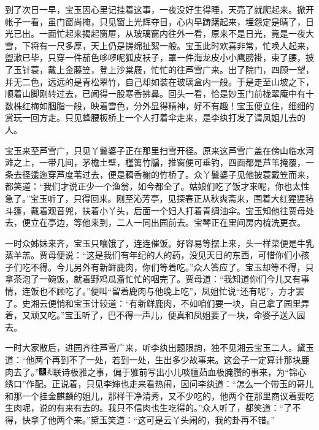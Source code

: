 到了次日一早，宝玉因心里记挂着这事，一夜没好生得睡，天亮了就爬起来。掀开帐子一看，虽门窗尚掩，只见窗上光辉夺目，心内早踌躇起来，埋怨定是晴了，日光已出。一面忙起来揭起窗屉，从玻璃窗内往外一看，原来不是日光，竟是一夜大雪，下将有一尺多厚，天上仍是搓绵扯絮一般。宝玉此时欢喜非常，忙唤人起来，盥漱已毕，只穿一件茄色哆啰呢狐皮袄子，罩一件海龙皮小小鹰膀褂，束了腰，披了玉针蓑，戴上金藤笠，登上沙棠屐，忙忙的往芦雪广来。出了院门，四顾一望，并无二色，远远的是青松翠竹，自己却如装在玻璃盒内一般。于是走至山坡之下，顺着山脚刚转过去，已闻得一股寒香拂鼻。回头一看，恰是妙玉门前栊翠庵中有十数株红梅如胭脂一般，映着雪色，分外显得精神，好不有趣！宝玉便立住，细细的赏玩一回方走。只见蜂腰板桥上一个人打着伞走来，是李纨打发了请凤姐儿去的人。

宝玉来至芦雪广，只见丫鬟婆子正在那里扫雪开径。原来这芦雪广盖在傍山临水河滩之上，一带几间，茅檐土壁，槿篱竹牖，推窗便可垂钓，四面都是芦苇掩覆，一条去径逶迤穿芦度苇过去，便是藕香榭的竹桥了。众丫鬟婆子见他披蓑戴笠而来，都笑道：``我们才说正少一个渔翁，如今都全了。姑娘们吃了饭才来呢，你也太性急了。''宝玉听了，只得回来。刚至沁芳亭，见探春正从秋爽斋来，围着大红猩猩毡斗篷，戴着观音兜，扶着小丫头，后面一个妇人打着青绸油伞。宝玉知他往贾母处去，便立在亭边，等他来到，二人一同出园前去。宝琴正在里间房内梳洗更衣。

一时众姊妹来齐，宝玉只嚷饿了，连连催饭。好容易等摆上来，头一样菜便是牛乳蒸羊羔。贾母便说：``这是我们有年纪的人的药，没见天日的东西，可惜你们小孩子们吃不得。今儿另外有新鲜鹿肉，你们等着吃。''众人答应了。宝玉却等不得，只拿茶泡了一碗饭，就着野鸡瓜齑忙忙的咽完了。贾母道：``我知道你们今儿又有事情，连饭也不顾吃了。''便叫``留着鹿肉与他晚上吃''，凤姐忙说``还有呢''，方才罢了。史湘云便悄和宝玉计较道：``有新鲜鹿肉，不如咱们要一块，自己拿了园里弄着，又顽又吃。''宝玉听了，巴不得一声儿，便真和凤姐要了一块，命婆子送入园去。

一时大家散后，进园齐往芦雪广来，听李纨出题限韵，独不见湘云宝玉二人。黛玉道：``他两个再到不了一处，若到一处，生出多少故事来。这会子一定算计那块鹿肉去了。''{{\includegraphics[width=3mm]{../Images/00004}\includegraphics[width=3mm]{../Images/00012}\footnotesize \kaishu 联诗极雅之事，偏于雅前写出小儿啖膻茹血极腌}臜{的事来，为``锦心绣口''作配。}}正说着，只见李婶也走来看热闹，因问李纨道：``怎么一个带玉的哥儿和那一个挂金麒麟的姐儿，那样干净清秀，又不少吃的，他两个在那里商议着要吃生肉呢，说的有来有去的。我只不信肉也生吃得的。''众人听了，都笑道：``了不得，快拿了他两个来。''黛玉笑道：``这可是云丫头闹的，我的卦再不错。''

